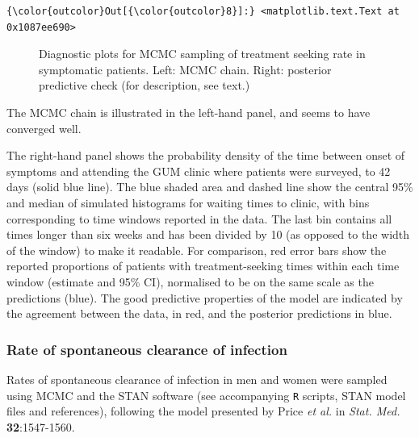 \documentclass{article}
\begin{document}
    \begin{footnotesize}
            \begin{Verbatim}[commandchars=\\\{\}]
{\color{outcolor}Out[{\color{outcolor}8}]:} <matplotlib.text.Text at 0x1087ee690>
\end{Verbatim}
    \end{footnotesize}
        
    \begin{figure}
        \begin{center}\end{center}
        \caption{Diagnostic plots for MCMC sampling of treatment seeking rate in symptomatic patients. Left: MCMC chain. Right: posterior predictive check (for description, see text.)}
        \label{fig:trt_seek_diagnostic}
    \end{figure}
    
    The MCMC chain is illustrated in the left-hand panel, and seems to have
converged well.

The right-hand panel shows the probability density of the time between
onset of symptoms and attending the GUM clinic where patients were
surveyed, to 42 days (solid blue line). The blue shaded area and dashed
line show the central 95\% and median of simulated histograms for
waiting times to clinic, with bins corresponding to time windows
reported in the data. The last bin contains all times longer than six
weeks and has been divided by 10 (as opposed to the width of the window)
to make it readable. For comparison, red error bars show the reported
proportions of patients with treatment-seeking times within each time
window (estimate and 95\% CI), normalised to be on the same scale as the
predictions (blue). The good predictive properties of the model are
indicated by the agreement between the data, in red, and the posterior
predictions in blue.

    \subsubsection{Rate of spontaneous clearance of
infection}\label{rate-of-spontaneous-clearance-of-infection}

Rates of spontaneous clearance of infection in men and women were
sampled using MCMC and the STAN software (see accompanying \texttt{R}
scripts, STAN model files and references), following the model presented
by Price \emph{et al.} in \emph{Stat. Med.} \textbf{32}:1547-1560.
\end{document}
